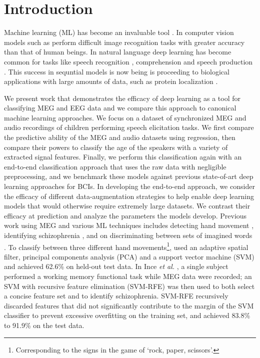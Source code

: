 \documentclass[utf8]{frontiersSCNS} %
\begin{document}
\section{Introduction}


Machine learning (ML) has become an invaluable tool \cite{LeCun2015}. In computer vision models such as \cite{He2015a} perform difficult image recognition tasks with greater accuracy than that of human beings. In natural language deep learning has become common for tasks like speech recognition \cite{Bahdanau}, comprehension \cite{Moritz} and speech production \cite{VanDenOord}. This success in sequntial models is now being is proceeding to biological applications with large amounts of data, such as protein localization \cite{Sonderby2015}.

We present work that demonstrates the efficacy of deep learning as a tool for classifying MEG and EEG data and we compare this approach to canonical machine learning approaches. We focus on a dataset of synchronized MEG and audio recordings of children performing speech elicitation tasks. We first compare the predictive ability of the MEG and audio datasets using regression, then compare their powers to classify the age of the speakers with a variety of extracted signal features. Finally, we perform this classification again with an end-to-end classification approach that uses the raw data with negligible preprocessing, and we benchmark these models against previous state-of-art deep learning approaches for BCIs. In developing the end-to-end approach, we consider the efficacy of different data-augmentation strategies to help enable deep learning models that would otherwise require extremely large datasets. We contrast their efficacy at prediction and analyze the parameters the models develop. Previous work using MEG and various ML techniques includes detecting hand movement \cite{Asano2009}, identifying schizophrenia \cite{Ince2008}, and on discriminating between sets of imagined words \cite{Guimaraes2007}. To classify between three different hand movements\footnote{Corresponding to the signs in the game of `rock, paper, scissors'.}, \cite{Asano2009} used an adaptive spatial filter, principal components analysis (PCA) and a support vector machine (SVM) and achieved 62.6\% on held-out test data. In Ince {\em et al.} \cite{Ince2008}, a single subject performed a working memory functional task while MEG data were recorded; an SVM with recursive feature elimination (SVM-RFE) was then used to both select a concise feature set and to identify schizophrenia. SVM-RFE recursively discarded features that did not significantly contribute to the margin of the SVM classifier to prevent excessive overfitting on the training set, and achieved 83.8\% to 91.9\% on the test data.
\end{document}
